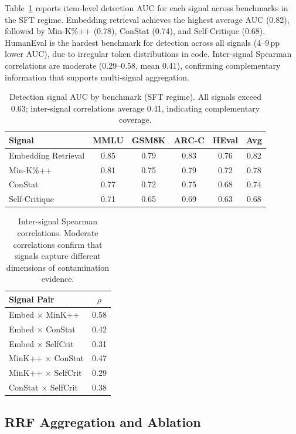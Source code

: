 \documentclass[letterpaper,11pt]{article}
\begin{document}
Table~\ref{tab:signal_auc} reports item-level detection AUC for each signal across benchmarks in the SFT regime. Embedding retrieval achieves the highest average AUC (0.82), followed by Min-K\%++ (0.78), ConStat (0.74), and Self-Critique (0.68). HumanEval is the hardest benchmark for detection across all signals (4--9\,pp lower AUC), due to irregular token distributions in code. Inter-signal Spearman correlations are moderate (0.29--0.58, mean 0.41), confirming complementary information that supports multi-signal aggregation.

\begin{table}[t]
\centering
\caption{Detection signal AUC by benchmark (SFT regime). All signals exceed 0.63; inter-signal correlations average 0.41, indicating complementary coverage.}
\label{tab:signal_auc}
\small
\begin{tabular}{lccccc}
\toprule
Signal & MMLU & GSM8K & ARC-C & HEval & Avg \\
\midrule
Embedding Retrieval & 0.85 & 0.79 & 0.83 & 0.76 & 0.82 \\
Min-K\%++ & 0.81 & 0.75 & 0.79 & 0.72 & 0.78 \\
ConStat & 0.77 & 0.72 & 0.75 & 0.68 & 0.74 \\
Self-Critique & 0.71 & 0.65 & 0.69 & 0.63 & 0.68 \\
\bottomrule
\end{tabular}
\end{table}

\begin{table}[t]
\centering
\caption{Inter-signal Spearman correlations. Moderate correlations confirm that signals capture different dimensions of contamination evidence.}
\label{tab:signal_corr}
\small
\begin{tabular}{lc}
\toprule
Signal Pair & $\rho$ \\
\midrule
Embed $\times$ MinK++ & 0.58 \\
Embed $\times$ ConStat & 0.42 \\
Embed $\times$ SelfCrit & 0.31 \\
MinK++ $\times$ ConStat & 0.47 \\
MinK++ $\times$ SelfCrit & 0.29 \\
ConStat $\times$ SelfCrit & 0.38 \\
\bottomrule
\end{tabular}
\end{table}

\subsection{RRF Aggregation and Ablation}
\label{sec:rrf}
\end{document}
